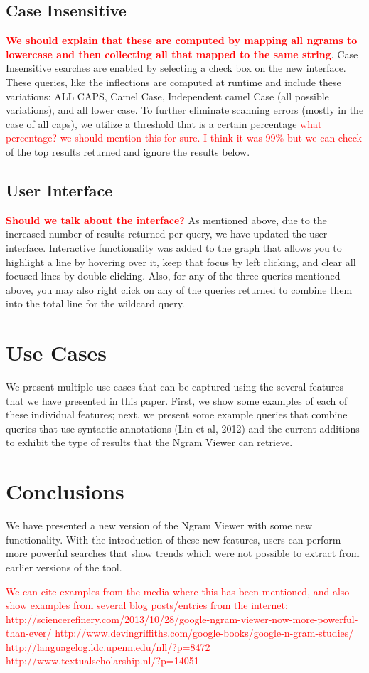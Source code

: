 \documentclass[11pt]{article}
\begin{document}
\subsection{Case Insensitive}
\textcolor{red}{\bf We should explain that these are computed by mapping all ngrams to lowercase and then collecting all that mapped to the same string}.
Case Insensitive searches are enabled by selecting a check box on the new interface. These queries, like the inflections are computed at runtime and include these variations: ALL CAPS, Camel Case, Independent camel Case (all possible variations), and all lower case. To further eliminate scanning errors (mostly in the case of all caps), we utilize a threshold that is a certain percentage \textcolor{red}{what percentage? we should mention this for sure. I think it was 99\% but we can check}
of the top results returned and ignore the results below.



\subsection{User Interface}
\label{sec:userint}
\textcolor{red}{\bf Should we talk about the interface?}
As mentioned above, due to the increased number of results returned per query, we have updated the user interface. Interactive functionality was added to the graph that allows you to highlight a line by hovering over it, keep that focus by left clicking, and clear all focused lines by double clicking. Also, for any of the three queries mentioned above, you may also right click on any of the queries returned to combine them into the total line for the wildcard query.


\section{Use Cases}
\label{sec:usecases}
We present multiple use cases that can be captured using the several features that we have presented in this paper. First, we show some examples of each of these individual features; next, we present some example queries that combine queries that use syntactic annotations (Lin et al, 2012) and the current additions to exhibit the type of results that the Ngram Viewer can retrieve.


\section{Conclusions}
We have presented a new version of the Ngram Viewer with some new functionality. With the introduction of these new features, users can perform more powerful searches that show trends which were not possible to extract from earlier versions of the tool. 

\textcolor{red}{We can cite examples from the media where this has been mentioned, and also show examples from several blog posts/entries from the internet:
http://sciencerefinery.com/2013/10/28/google-ngram-viewer-now-more-powerful-than-ever/
http://www.devingriffiths.com/google-books/google-n-gram-studies/
http://languagelog.ldc.upenn.edu/nll/?p=8472
http://www.textualscholarship.nl/?p=14051}





\end{document}
